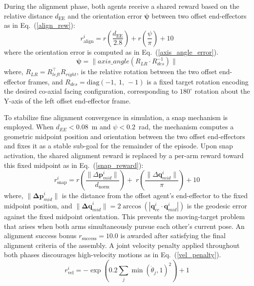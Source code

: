 \documentclass[a4paper,fleqn]{cas-dc}
\begin{document}
\noindent During the alignment phase, both agents receive a shared reward based on the relative distance $d_{\text{EE}}$ and the orientation error $\mathbf{\psi}$ between two offset end-effectors as in Eq.~(\ref{align_rew}):
\begin{equation}
r^{i}_{\text{align}} = r\left(\frac{d_{\text{EE}}}{2.8}\right) + r\left(\frac{\psi}{\pi}\right) + 10
\label{align_rew}
\end{equation}
where the orientation error is computed as in Eq.~(\ref{axis_angle_error}).
\begin{equation}
    \mathbf{\psi} = \lVert axis\_angle(R_{LR}\cdot R^{-1}_{des})\rVert
    \label{axis_angle_error}
\end{equation}
\noindent where, $R_{LR} = R_{left}^{\top} R_{right}$, is the relative rotation between the two offset end-effector frames, and $R_{des} = \text{diag}(-1,\ 1,\ -1)$ is a fixed target rotation encoding the desired co-axial facing configuration, corresponding to $180^{\circ}$ rotation about the Y-axis of the left offset end-effector frame.

\noindent To stabilize fine alignment convergence in simulation, a snap mechanism is employed. When $d_{EE} < 0.08$~m and $\psi < 0.2$~rad, the mechanism computes a geometric midpoint position and orientation between the two offset end-effectors and fixes it as a stable sub-goal for the remainder of the episode. Upon snap activation, the shared alignment reward is replaced by a per-arm reward toward this fixed midpoint as in Eq.~(\ref{snap_reward}):
\begin{equation}
r^{i}_{\text{snap}} = 
r\left(\frac{\lVert \Delta \mathbf{p}_{mid}^i \rVert}{d_\text{norm}}\right) +\;
r\left(\frac{\lVert \Delta \mathbf{q}_{mid}^i \rVert}{\pi}\right) + 10
\label{snap_reward}
\end{equation}
where, $\|\mathbf{\Delta p}_{mid}^{i}\|$ is the distance from the offset agent's end-effector to the fixed midpoint position, and $\|\mathbf{\Delta q}_{mid}^{i}\| = 2\arccos(|\mathbf{q}_{ee}^{i} \cdot \mathbf{q}_{mid}^{i}|)$ is the geodesic error against the fixed midpoint orientation. This prevents the moving-target problem that arises when both arms simultaneously pursue each other's current pose. An alignment success bonus $r_{\text{success}} = 10.0$ is awarded after satisfying the final alignment criteria of the assembly. A joint velocity penalty applied throughout both phases discourages high-velocity motions as in Eq.~(\ref{vel_penalty}).
\begin{equation}
r^{i}_{\text{vel}} = -\exp\left( 0.2 \sum_{j} \min\left( \dot{\theta}_{j}, 1 \right)^{2} \right) + 1
\label{vel_penalty}
\end{equation}
\end{document}
